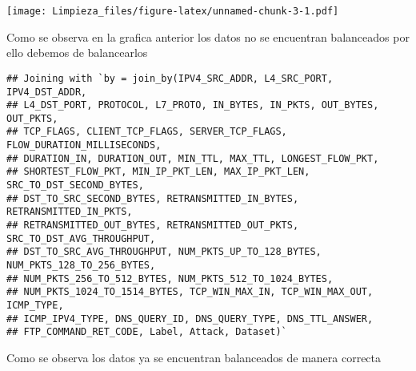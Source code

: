 \documentclass[
]{article}
\newenvironment{Shaded}{\begin{snugshade}}{\end{snugshade}}
\newcommand{\AttributeTok}[1]{\textcolor[rgb]{0.77,0.63,0.00}{#1}}
\newcommand{\DecValTok}[1]{\textcolor[rgb]{0.00,0.00,0.81}{#1}}
\newcommand{\FunctionTok}[1]{\textcolor[rgb]{0.00,0.00,0.00}{#1}}
\newcommand{\NormalTok}[1]{#1}
\newcommand{\OtherTok}[1]{\textcolor[rgb]{0.56,0.35,0.01}{#1}}
\newcommand{\SpecialCharTok}[1]{\textcolor[rgb]{0.00,0.00,0.00}{#1}}
\newcommand{\StringTok}[1]{\textcolor[rgb]{0.31,0.60,0.02}{#1}}
\begin{document}
\texttt{[image: Limpieza\_files/figure-latex/unnamed-chunk-3-1.pdf]}

Como se observa en la grafica anterior los datos no se encuentran
balanceados por ello debemos de balancearlos

\begin{Shaded}
\end{Shaded}

\begin{verbatim}
## Joining with `by = join_by(IPV4_SRC_ADDR, L4_SRC_PORT, IPV4_DST_ADDR,
## L4_DST_PORT, PROTOCOL, L7_PROTO, IN_BYTES, IN_PKTS, OUT_BYTES, OUT_PKTS,
## TCP_FLAGS, CLIENT_TCP_FLAGS, SERVER_TCP_FLAGS, FLOW_DURATION_MILLISECONDS,
## DURATION_IN, DURATION_OUT, MIN_TTL, MAX_TTL, LONGEST_FLOW_PKT,
## SHORTEST_FLOW_PKT, MIN_IP_PKT_LEN, MAX_IP_PKT_LEN, SRC_TO_DST_SECOND_BYTES,
## DST_TO_SRC_SECOND_BYTES, RETRANSMITTED_IN_BYTES, RETRANSMITTED_IN_PKTS,
## RETRANSMITTED_OUT_BYTES, RETRANSMITTED_OUT_PKTS, SRC_TO_DST_AVG_THROUGHPUT,
## DST_TO_SRC_AVG_THROUGHPUT, NUM_PKTS_UP_TO_128_BYTES, NUM_PKTS_128_TO_256_BYTES,
## NUM_PKTS_256_TO_512_BYTES, NUM_PKTS_512_TO_1024_BYTES,
## NUM_PKTS_1024_TO_1514_BYTES, TCP_WIN_MAX_IN, TCP_WIN_MAX_OUT, ICMP_TYPE,
## ICMP_IPV4_TYPE, DNS_QUERY_ID, DNS_QUERY_TYPE, DNS_TTL_ANSWER,
## FTP_COMMAND_RET_CODE, Label, Attack, Dataset)`
\end{verbatim}

Como se observa los datos ya se encuentran balanceados de manera
correcta

\begin{Shaded}
\end{Shaded}
\end{document}
